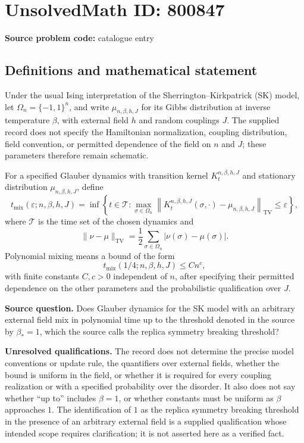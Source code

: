 \documentclass[11pt]{article}
\begin{document}
\section*{UnsolvedMath ID: 800847}
\textbf{Source problem code:} catalogue entry
\subsection{Definitions and mathematical statement}
Under the usual Ising interpretation of the Sherrington--Kirkpatrick (SK) model, let \(\Omega_n=\{-1,1\}^n\), and write \(\mu_{n,\beta,h,J}\) for its Gibbs distribution at inverse temperature \(\beta\), with external field \(h\) and random couplings \(J\). The supplied record does not specify the Hamiltonian normalization, coupling distribution, field convention, or permitted dependence of the field on \(n\) and \(J\); these parameters therefore remain schematic.

For a specified Glauber dynamics with transition kernel \(K_t^{n,\beta,h,J}\) and stationary distribution \(\mu_{n,\beta,h,J}\), define
\[
 t_{\mathrm{mix}}(\varepsilon;n,\beta,h,J)
 =\inf\left\{t\in\mathcal T:
 \max_{\sigma\in\Omega_n}
 \left\|K_t^{n,\beta,h,J}(\sigma,\cdot)-\mu_{n,\beta,h,J}\right\|_{\mathrm{TV}}
 \leq\varepsilon\right\},
\]
where \(\mathcal T\) is the time set of the chosen dynamics and
\[
 \|\nu-\mu\|_{\mathrm{TV}}
 =\frac12\sum_{\sigma\in\Omega_n}|\nu(\sigma)-\mu(\sigma)|.
\]
Polynomial mixing means a bound of the form
\[
 t_{\mathrm{mix}}(1/4;n,\beta,h,J)\leq Cn^c,
\]
with finite constants \(C,c>0\) independent of \(n\), after specifying their permitted dependence on the other parameters and the probabilistic qualification over \(J\).

\textbf{Source question.} Does Glauber dynamics for the SK model with an arbitrary external field mix in polynomial time up to the threshold denoted in the source by \(\beta_\ast=1\), which the source calls the replica symmetry breaking threshold?

\textbf{Unresolved qualifications.} The record does not determine the precise model conventions or update rule, the quantifiers over external fields, whether the bound is uniform in the field, or whether it is required for every coupling realization or with a specified probability over the disorder. It also does not say whether ``up to'' includes \(\beta=1\), or whether constants must be uniform as \(\beta\) approaches \(1\). The identification of \(1\) as the replica symmetry breaking threshold in the presence of an arbitrary external field is a supplied qualification whose intended scope requires clarification; it is not asserted here as a verified fact.
\end{document}
